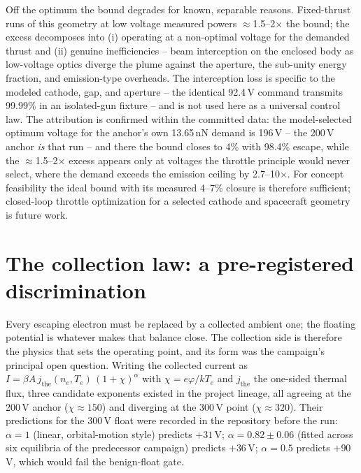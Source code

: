 \documentclass[11pt]{article}
\begin{document}
Off the optimum the bound degrades for known, separable reasons.
Fixed-thrust runs of this geometry at low voltage measured powers
$\approx$1.5--2$\times$ the bound; the excess decomposes into (i) operating
at a non-optimal voltage for the demanded thrust and (ii) genuine
inefficiencies -- beam interception on the enclosed body as low-voltage
optics diverge the plume against the aperture, the sub-unity energy
fraction, and emission-type overheads. The interception loss is specific to
the modeled cathode, gap, and aperture -- the identical 92.4\,V command
transmits 99.99\% in an isolated-gun fixture -- and is not used here as a
universal control law. The attribution is confirmed within the committed
data: the model-selected optimum voltage for the anchor's own 13.65\,nN
demand is 196\,V -- the 200\,V anchor \emph{is} that run -- and there the
bound closes to 4\% with 98.4\% escape, while the
$\approx$1.5--2$\times$ excess appears only at voltages the throttle
principle would never select, where the demand exceeds the emission
ceiling by 2.7--10$\times$. For concept feasibility the ideal bound with
its measured 4--7\% closure is therefore sufficient; closed-loop throttle
optimization for a selected cathode and spacecraft geometry is future
work.

\section{The collection law: a pre-registered discrimination}
\label{sec:collection}
Every escaping electron must be replaced by a collected ambient one; the
floating potential is whatever makes that balance close. The collection
side is therefore the physics that sets the operating point, and its form
was the campaign's principal open question. Writing the collected current
as $I = \beta A\, j_{\mathrm{the}}(n_e,T_e)\,(1+\chi)^{\alpha}$ with
$\chi = e\varphi/kT_e$ and $j_{\mathrm{the}}$ the one-sided thermal flux,
three candidate exponents existed in the project lineage, all agreeing at
the 200\,V anchor ($\chi \approx 150$) and diverging at the 300\,V point
($\chi \approx 320$). Their predictions for the 300\,V float were recorded
in the repository before the run: $\alpha = 1$ (linear, orbital-motion
style) predicts $+31$\,V; $\alpha = 0.82 \pm 0.06$ (fitted across six
equilibria of the predecessor campaign) predicts $+36$\,V; $\alpha = 0.5$
predicts $+90$\,V, which would fail the benign-float gate.
\end{document}

